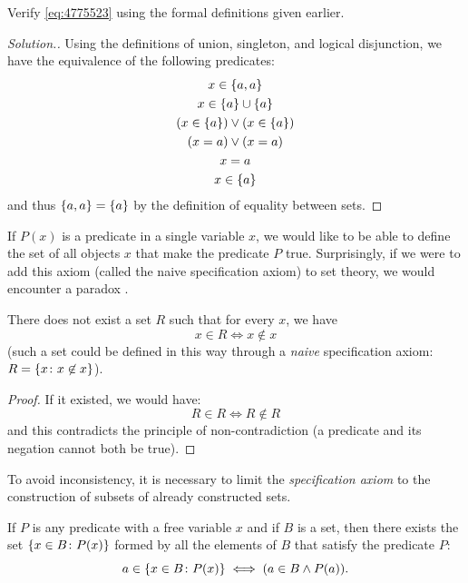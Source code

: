 \begin{exercise}
  Verify \eqref{eq:4775523} using the formal definitions given earlier.
\end{exercise}
\begin{proof}[Solution.]
Using the definitions of union, singleton, and logical disjunction, we have the
equivalence of the following predicates:
\begin{gather*}
  x \in {\left\{ a,a \right\}}  \\
  x \in {\left\{ a \right\}} \cup {\left\{ a \right\}}\\
  (x \in {\left\{ a \right\}}) \lor (x \in {\left\{ a \right\}})\\
  (x = a) \lor (x = a) \\
  x = a \\
  x \in {\left\{ a \right\}}
\end{gather*}
and thus ${\left\{ a,a \right\}}={\left\{ a \right\}}$ by the definition of equality between sets.
\end{proof}

If $P(x)$ is a predicate in a single variable $x$, we would like to be able to
define the set of all objects $x$ that make the predicate $P$ true.
Surprisingly, if we were to add this axiom (called the naive specification
axiom) to set theory, we would encounter a paradox%
%
%
%
%
%
.

\begin{theorem}
\label{th:Russell}%
There does not exist a set $R$ such that for every $x$, we have
\[
   x\in R \iff x\not \in x
\]
(such a set could be defined in this way through a \emph{naive} specification
axiom: $R={\left\{ x\colon x\not \in x \right\}}$).
\end{theorem}
%
\begin{proof}
  If it existed, we would have:
  \[
    R \in R 
    \iff R\not \in R
  \]
    and this contradicts the principle of non-contradiction (a predicate and its
  negation cannot both be true).
\end{proof}

To avoid inconsistency, it is necessary to limit the \emph{specification axiom}
to the construction of subsets of already constructed sets.

\begin{axiom}[specification]
    If $P$ is any predicate with a free variable $x$ and if $B$ is a set, then
  there exists the set ${\left\{ x\in B\colon P(x) \right\}}$ formed by all the elements
  of $B$ that satisfy the predicate $P$:
\[
  a \in {\left\{ x\in B\colon P(x) \right\}} \iff (a \in B \land P(a)).
\]
\end{axiom}


